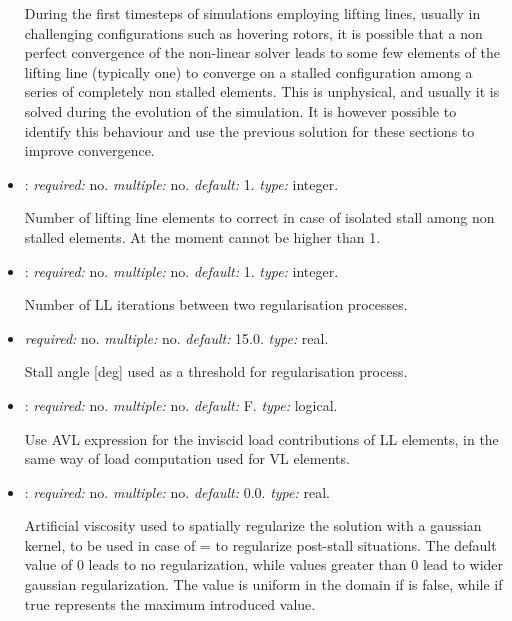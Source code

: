 \begin{itemize}
During the first timesteps of simulations employing lifting lines, 
usually in challenging configurations such as hovering rotors, 
it is possible that a non perfect convergence of the non-linear 
solver leads to some few elements of the lifting line (typically one) 
to converge on a stalled configuration among a series of completely 
non stalled elements. This is unphysical, and usually it is solved 
during the evolution of the simulation. It is however possible to 
identify this behaviour and use the previous solution for these 
sections to improve convergence. 

\item {}: \textit{required:} no. 
\textit{multiple:} no. \textit{default:} 1. \textit{type:} integer.

Number of lifting line elements to correct in case of isolated 
stall among non stalled elements. At the moment cannot be higher than 1.

\item {}: \textit{required:} no. 
\textit{multiple:} no. \textit{default:} 1. \textit{type:} integer.

Number of LL iterations between two regularisation processes.

\item {} \textit{required:} no. 
\textit{multiple:} no. \textit{default:} 15.0. \textit{type:} real.

Stall angle [deg] used as a threshold for regularisation process. 

\item {}: \textit{required:} no. \textit{multiple:} no. 
\textit{default:} F. \textit{type:} logical.

Use AVL expression for the inviscid load contributions of LL elements, 
in the same way of load computation used for VL elements. 

\item {}: \textit{required:} no. 
\textit{multiple:} no. \textit{default:} 0.0. \textit{type:} real.

Artificial viscosity used to spatially regularize the solution with 
a gaussian kernel, to be used in case of  =  
to regularize post-stall situations. The default value of 0 leads to no 
regularization, while values greater than 0 lead to wider gaussian regularization. 
The value is uniform in the domain if  is 
false, while if true represents the maximum introduced value.


\end{itemize}
